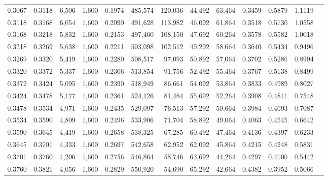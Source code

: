 \begin{tabular}{rrrrrrrrrrrrr}
0.3067 & 0.3118 &  6,506 & 1,600 &                                     0.1974 & 485,574 & 120,036 &  44,492 &  63,464 & 0.3459 & 0.5879 & 1.1119 \\
0.3118 & 0.3168 &  6,054 & 1,600 &                                     0.2090 & 491,628 & 113,982 &  46,092 &  61,864 & 0.3518 & 0.5730 & 1.0558 \\
0.3168 & 0.3218 &  5,832 & 1,600 &                                     0.2153 & 497,460 & 108,150 &  47,692 &  60,264 & 0.3578 & 0.5582 & 1.0018 \\
0.3218 & 0.3269 &  5,638 & 1,600 &                                     0.2211 & 503,098 & 102,512 &  49,292 &  58,664 & 0.3640 & 0.5434 & 0.9496 \\
0.3269 & 0.3320 &  5,419 & 1,600 &                                     0.2280 & 508,517 &  97,093 &  50,892 &  57,064 & 0.3702 & 0.5286 & 0.8994 \\
0.3320 & 0.3372 &  5,337 & 1,600 &                                     0.2306 & 513,854 &  91,756 &  52,492 &  55,464 & 0.3767 & 0.5138 & 0.8499 \\
0.3372 & 0.3424 &  5,095 & 1,600 &                                     0.2390 & 518,949 &  86,661 &  54,092 &  53,864 & 0.3833 & 0.4989 & 0.8027 \\
0.3424 & 0.3478 &  5,177 & 1,600 &                                     0.2361 & 524,126 &  81,484 &  55,692 &  52,264 & 0.3908 & 0.4841 & 0.7548 \\
0.3478 & 0.3534 &  4,971 & 1,600 &                                     0.2435 & 529,097 &  76,513 &  57,292 &  50,664 & 0.3984 & 0.4693 & 0.7087 \\
0.3534 & 0.3590 &  4,809 & 1,600 &                                     0.2496 & 533,906 &  71,704 &  58,892 &  49,064 & 0.4063 & 0.4545 & 0.6642 \\
0.3590 & 0.3645 &  4,419 & 1,600 &                                     0.2658 & 538,325 &  67,285 &  60,492 &  47,464 & 0.4136 & 0.4397 & 0.6233 \\
0.3645 & 0.3701 &  4,333 & 1,600 &                                     0.2697 & 542,658 &  62,952 &  62,092 &  45,864 & 0.4215 & 0.4248 & 0.5831 \\
0.3701 & 0.3760 &  4,206 & 1,600 &                                     0.2756 & 546,864 &  58,746 &  63,692 &  44,264 & 0.4297 & 0.4100 & 0.5442 \\
0.3760 & 0.3821 &  4,056 & 1,600 &                                     0.2829 & 550,920 &  54,690 &  65,292 &  42,664 & 0.4382 & 0.3952 & 0.5066 \\

\end{tabular}

